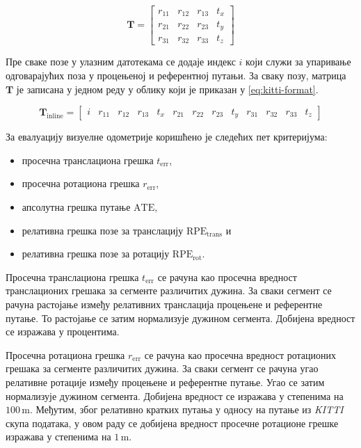 \documentclass[12pt]{article}
\begin{document}
\begin{equation}
	\mathbf{T} =
	\begin{bmatrix}
		r_{11} & r_{12} & r_{13} & t_x \\
		r_{21} & r_{22} & r_{23} & t_y \\
		r_{31} & r_{32} & r_{33} & t_z
	\end{bmatrix}
	\label{eq:kitti-poza}
\end{equation}

Пре сваке позе у улазним датотекама се додаје индекс $i$ који служи за
упаривање одговарајућих поза у процењеној и референтној путањи. За сваку позу,
матрица $\mathbf{T}$ је записана у једном реду у облику који је приказан у
\eqref{eq:kitti-format}.

\begin{equation}
	\mathbf{T}_{\mathrm{inline}} =
	\left[
		\begin{array}{ccccccccccccc}
			i      &
			r_{11} & r_{12} & r_{13} & t_x &
			r_{21} & r_{22} & r_{23} & t_y &
			r_{31} & r_{32} & r_{33} & t_z
		\end{array}
		\right]
	\label{eq:kitti-format}
\end{equation}

За евалуацију визуелне одометрије коришћено је следећих пет критеријума:
\begin{itemize}
	\item просечна транслациона грешка $t_{\mathrm{err}}$,
	\item просечна ротациона грешка $r_{\mathrm{err}}$,
	\item апсолутна грешка путање $\mathrm{ATE}$,
	\item релативна грешка позе за транслацију $\mathrm{RPE}_{\mathrm{trans}}$ и
	\item релативна грешка позе за ротацију $\mathrm{RPE}_{\mathrm{rot}}$.
\end{itemize}

Просечна транслациона грешка $t_{\mathrm{err}}$ се рачуна као просечна вредност
транслационих грешака за сегменте различитих дужина. За сваки сегмент се рачуна
растојање између релативних транслација процењене и референтне путање. То
растојање се затим нормализује дужином сегмента. Добијена вредност се изражава
у процентима.

Просечна ротациона грешка $r_{\mathrm{err}}$ се рачуна као просечна вредност
ротационих грешака за сегменте различитих дужина. За сваки сегмент се рачуна
угао релативне ротације између процењене и референтне путање. Угао се затим
нормализује дужином сегмента. Добијена вредност се изражава у степенима на
$100\,\mathrm{m}$. Међутим, због релативно кратких путања у односу на путање из
\textit{KITTI} скупа података, у овом раду се добијена вредност просечне
ротационе грешке изражава у степенима на $1\,\mathrm{m}$.
\end{document}
